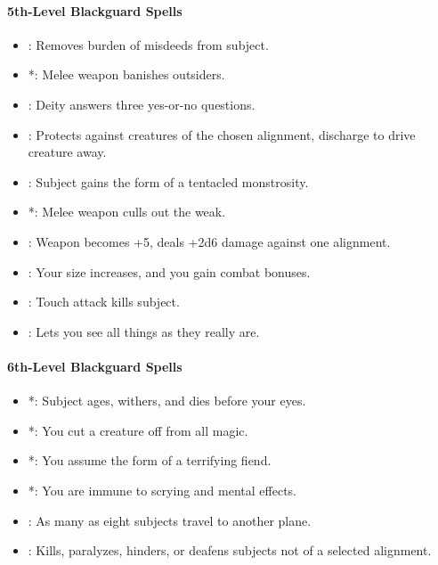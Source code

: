 \paragraph{5th-Level Blackguard Spells}
\begin{itemize}
 \item {}: Removes burden of misdeeds from subject.
 \item {}*: Melee weapon banishes outsiders.
 \item {}: Deity answers three yes-or-no questions.
 \item {}: Protects against creatures of the chosen alignment, discharge to drive creature away.
 \item {}: Subject gains the form of a tentacled monstrosity. %
 \item {}*: Melee weapon culls out the weak. %
 \item {}: Weapon becomes +5, deals +2d6 damage against one alignment.
 \item {}: Your size increases, and you gain combat bonuses.
 \item {}: Touch attack kills subject. %
 \item {}: Lets you see all things as they really are.
\end{itemize}
\paragraph{6th-Level Blackguard Spells}
\begin{itemize}
 \item {}*: Subject ages, withers, and dies before your eyes. %
 \item {}*: You cut a creature off from all magic.%
 \item {}*: You assume the form of a terrifying fiend.
 \item {}*: You are immune to scrying and mental effects.
 \item {}: As many as eight subjects travel to another plane.
 \item {}: Kills, paralyzes, hinders, or deafens subjects not of a selected alignment.
\end{itemize}